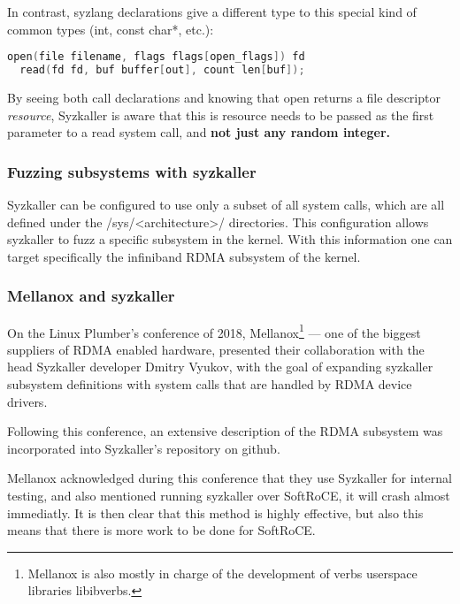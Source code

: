 In contrast, syzlang declarations give a different type to this special kind of common types (int, const char*, etc.):

\begin{lstlisting}[caption={syzlang definitions for open and read}, label={lst:syzlangdefs}, language=c]
  open(file filename, flags flags[open_flags]) fd
  read(fd fd, buf buffer[out], count len[buf]);
\end{lstlisting}

By seeing both call declarations and knowing that open returns a file descriptor \emph{resource}, Syzkaller is aware
that this is resource needs to be passed as the first parameter to a read system call, and \textbf{not just any random integer.}

\subsubsection{Fuzzing subsystems with syzkaller}

Syzkaller can be configured to use only a subset of all system calls, which are all defined under
the /sys/\textless architecture\textgreater/ directories. This configuration allows syzkaller to fuzz
a specific subsystem in the kernel. With this information one can target specifically
the infiniband RDMA subsystem of the kernel.


\subsubsection{Mellanox and syzkaller}

On the Linux Plumber's conference of 2018, Mellanox\footnote{Mellanox is also mostly in charge of the development  of verbs userspace libraries libibverbs.} --- one of the biggest suppliers of RDMA enabled hardware,
presented their collaboration with the head Syzkaller
developer Dmitry Vyukov, with the goal of expanding syzkaller subsystem definitions with system calls
that are handled by RDMA device drivers\cite{osherovichImprovingTestingRDMA2018}.

Following this conference, an extensive description of the RDMA subsystem was incorporated into Syzkaller's repository on github.

Mellanox acknowledged during this conference that they use Syzkaller for internal testing,
and also mentioned running syzkaller over SoftRoCE, it will crash almost immediatly. It is then clear
that this method is highly effective, but also this means that there is more work to be done
for SoftRoCE.


